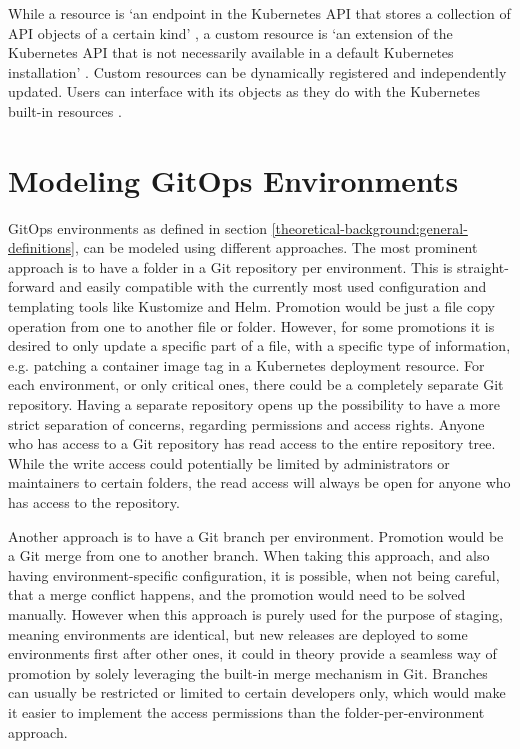 While a resource is
\enquote*{an endpoint in the Kubernetes API that stores a collection of API objects of a certain kind}
\autocite{customResourcesKubernetesIO},
a custom resource is
\enquote*{an extension of the Kubernetes API that is not necessarily available in a default Kubernetes installation}
\autocite{customResourcesKubernetesIO}.
Custom resources can be dynamically registered and independently updated.
Users can interface with its objects as they do with the Kubernetes built-in resources
\autocite{customResourcesKubernetesIO}.









\section{Modeling GitOps Environments}

GitOps environments as defined in section
\ref{theoretical-background:general-definitions},
can be modeled using different approaches.
The most prominent approach is to have a folder in a Git repository
per environment. This is straight-forward and easily compatible with
the currently most used configuration and templating tools like Kustomize and Helm.
Promotion would be just a file copy operation from one to another file or folder.
However, for some promotions it is desired to only update a specific part of a file,
with a specific type of information, e.g. patching a container image tag in a Kubernetes
deployment resource.
For each environment, or only critical ones, there could be a completely separate Git repository.
Having a separate repository opens up the possibility to have a more strict separation of concerns,
regarding permissions and access rights.
Anyone who has access to a Git repository has read access to the entire repository tree.
While the write access could potentially be limited by administrators or maintainers
to certain folders, the read access will always be open for anyone who has access to the repository.

Another approach is to have a Git branch per environment.
Promotion would be a Git merge from one to another branch.
When taking this approach, and also having environment-specific configuration,
it is possible, when not being careful, that a merge conflict happens,
and the promotion would need to be solved manually.
However when this approach is purely used for the purpose of staging,
meaning environments are identical, but new releases are deployed to some environments first
after other ones,
it could in theory provide a seamless way of promotion by solely leveraging the built-in merge mechanism in Git.
Branches can usually be restricted or limited to certain developers only,
which would make it easier to implement the access permissions than the folder-per-environment approach.

